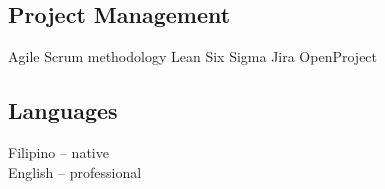 \documentclass[top=0in]{deedy-resume-openfont}
\begin{document}
\begin{minipage}[t]{0.33\textwidth}
\subsection{Project Management}
Agile
\textbullet{} Scrum methodology
\textbullet{} Lean Six Sigma
\textbullet{} Jira
\textbullet{} OpenProject
\sectionsep

\subsection{Languages}
Filipino -- native
\\English -- professional
\sectionsep






\end{minipage}
\end{document}

